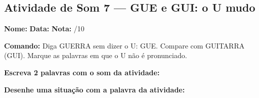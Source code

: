 \subsection{Atividade de Som 7 --- GUE e GUI: o U mudo}
\begin{exercicio}



\noindent\textbf{Nome:} \underline{\hspace{3.2cm}} \quad \textbf{Data:} \underline{\hspace{1.6cm}} \quad \textbf{Nota:} \underline{\hspace{0.9cm}}/10


\noindent\textbf{Comando:} Diga GUERRA sem dizer o U: GUE. Compare com GUITARRA (GUI). Marque as palavras em que o U não é pronunciado.


\begin{center}
\end{center}

\noindent\textbf{Escreva 2 palavras com o som da atividade:}

\begin{center}
  \underline{\hspace{3cm}} \quad \underline{\hspace{3cm}}
\end{center}

\noindent\textbf{Desenhe uma situação com a palavra da atividade:}

\begin{center}
\end{center}

\end{exercicio}



